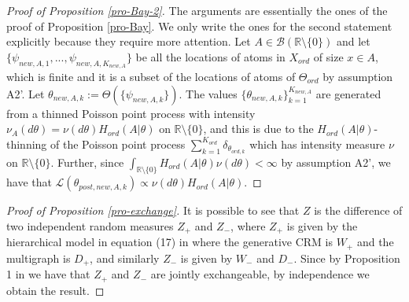 \documentclass{article}
\theoremstyle{plain}
\theoremstyle{remark}
\begin{document}
\begin{proof}[Proof of Proposition \ref{pro-Bay-2}]
	The arguments are essentially the ones of the proof of Proposition \ref{pro-Bay}. We only write the ones for the second statement explicitly because they require more attention. Let $A\in\mathcal{B}(\mathbb{R}\setminus\{0\})$ and let $\{\psi_{new,A,1},...,\psi_{new,A,K_{new,A}}\}$ be all the locations of atoms in $X_{ord}$ of size $x\in A$, which is finite and it is a subset of the locations of atoms of $\Theta_{ord}$ by assumption A2'. Let $\theta_{new,A,k}:=\Theta(\{\psi_{new,A,k}\})$. The values $\{\theta_{new,A,k} \}_{k=1}^{K_{new,A}}$ are generated from a thinned Poisson point process with intensity $\nu_{A}(d\theta)=\nu(d\theta)H_{ord}(A|\theta)$ on $\mathbb{R}\setminus\{0\}$, and this is due to the $H_{ord}(A|\theta)$-thinning of the Poisson point process $\sum_{k=1}^{K_{ord}}\delta_{\theta_{ord,k}}$ which has intensity measure $\nu$ on $\mathbb{R}\setminus\{0\}$. Further, since $\int_{\mathbb{R}\setminus\{0\}}H_{ord}(A|\theta)\nu(d\theta)<\infty$ by assumption A2', we have that $\mathcal{L}(\theta_{post,new,A,k})\varpropto\nu(d\theta)H_{ord}(A|\theta)$.
\end{proof}









\begin{proof}[Proof of Proposition \ref{pro-exchange}]
	It is possible to see that $Z$ is the difference of two independent random measures $Z_+$ and $Z_-$, where $Z_+$ is given by the hierarchical model in equation (17) in \cite{Caron-and-Fox} where the generative CRM is $W_+$  and the multigraph is $D_+$, and similarly $Z_-$ is given by $W_-$ and $D_-$. Since by Proposition 1 in \cite{Caron-and-Fox} we have that $Z_+$ and $Z_-$ are jointly exchangeable, by independence we obtain the result.
\end{proof}
\end{document}
